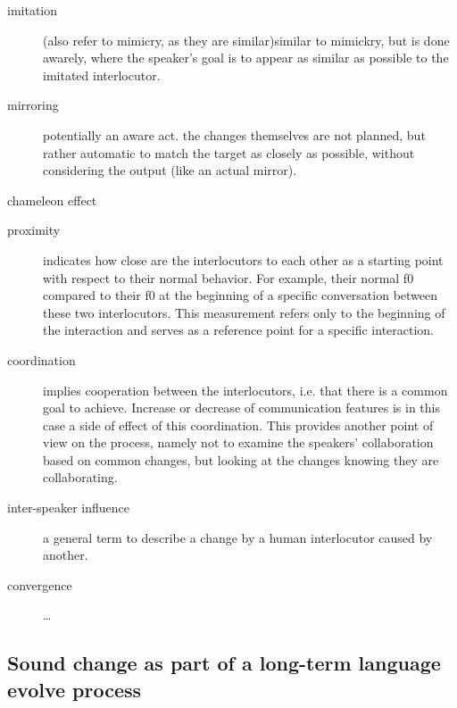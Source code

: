 \begin{description}
	\item[imitation] (also refer to mimicry, as they are similar)similar to mimickry, but is done awarely, where the speaker's goal is to appear as similar as possible to the imitated interlocutor.
	
	\item[mirroring] potentially an aware act. the changes themselves are not planned, but rather automatic to match the target as closely as possible, without considering the output (like an actual mirror).
	
	\item[chameleon effect] \citep{Chartrand1999chameleon}
	
	\item[proximity] indicates how close are the interlocutors to each other as a starting point with respect to their normal behavior.
	For example, their normal f0 compared to their f0 at the beginning of a specific conversation between these two interlocutors.
	This measurement refers only to the beginning of the interaction and serves as a reference point for a specific interaction.
	
	\item[coordination] implies cooperation between the interlocutors, i.e. that there is a common goal to achieve.
	Increase or decrease of communication features is in this case a side of effect of this coordination.
	This provides another point of view on the process, namely not to examine the speakers' collaboration based on common changes, but looking at the changes knowing they are collaborating.
	
	\item[inter-speaker influence] a general term to describe a change by a human interlocutor caused by another.
	
	\item[convergence] \ldots
\end{description}

\subsection[Long-term sound change]{Sound change as part of a long-term language evolve process}
\label{subsec:sound_change}

\citet{Ohala1989sound}\\
\citet{Ohala1990phonetics}\\
\citet{Ohala1993phonetics}\\ %

